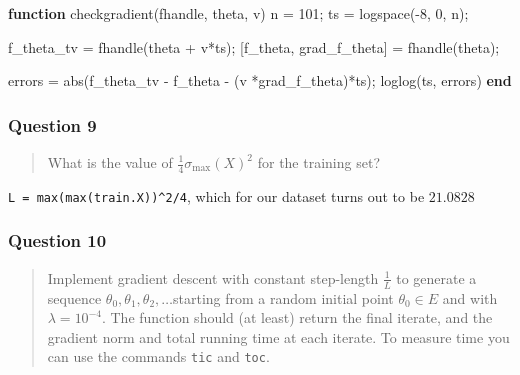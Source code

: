 \documentclass[
]{article}
\newenvironment{Shaded}{}{}
\newcommand{\FloatTok}[1]{\textcolor[rgb]{0.25,0.63,0.44}{#1}}
\newcommand{\KeywordTok}[1]{\textcolor[rgb]{0.00,0.44,0.13}{\textbf{#1}}}
\newcommand{\NormalTok}[1]{#1}
\newcommand{\OperatorTok}[1]{\textcolor[rgb]{0.40,0.40,0.40}{#1}}
\newcommand{\VariableTok}[1]{\textcolor[rgb]{0.10,0.09,0.49}{#1}}
\begin{document}
\begin{Shaded}
\begin{Highlighting}[]
\KeywordTok{function} \VariableTok{checkgradient}\NormalTok{(}\VariableTok{fhandle}\OperatorTok{,} \VariableTok{theta}\OperatorTok{,} \VariableTok{v}\NormalTok{)    }
    \VariableTok{n} \OperatorTok{=} \FloatTok{101}\OperatorTok{;}
    \VariableTok{ts} \OperatorTok{=} \VariableTok{logspace}\NormalTok{(}\OperatorTok{{-}}\FloatTok{8}\OperatorTok{,} \FloatTok{0}\OperatorTok{,} \VariableTok{n}\NormalTok{)}\OperatorTok{;}
    
    \VariableTok{f\_theta\_tv} \OperatorTok{=} \VariableTok{fhandle}\NormalTok{(}\VariableTok{theta} \OperatorTok{+} \VariableTok{v}\OperatorTok{*}\VariableTok{ts}\NormalTok{)}\OperatorTok{;}
\NormalTok{    [}\VariableTok{f\_theta}\OperatorTok{,} \VariableTok{grad\_f\_theta}\NormalTok{] }\OperatorTok{=} \VariableTok{fhandle}\NormalTok{(}\VariableTok{theta}\NormalTok{)}\OperatorTok{;}

    \VariableTok{errors} \OperatorTok{=} \VariableTok{abs}\NormalTok{(}\VariableTok{f\_theta\_tv} \OperatorTok{{-}} \VariableTok{f\_theta} \OperatorTok{{-}}\NormalTok{ (}\VariableTok{v}\OperatorTok{\textquotesingle{}} \OperatorTok{*}\VariableTok{grad\_f\_theta}\NormalTok{)}\OperatorTok{*}\VariableTok{ts}\NormalTok{)}\OperatorTok{;}
    \VariableTok{loglog}\NormalTok{(}\VariableTok{ts}\OperatorTok{,} \VariableTok{errors}\NormalTok{)}
\KeywordTok{end}
\end{Highlighting}
\end{Shaded}

\hypertarget{question-9}{%
\subsubsection{Question 9}\label{question-9}}

\begin{quote}
What is the value of \(\frac{1}{4}\sigma_{\max}(X)^2\) for the training
set?
\end{quote}

\texttt{L\ =\ max(max(train.X))\^{}2/4}, which for our dataset turns out
to be \(21.0828\)

\hypertarget{question-10}{%
\subsubsection{Question 10}\label{question-10}}

\begin{quote}
Implement gradient descent with constant step-length \(\frac{1}{L}\) to
generate a sequence \(\theta_0 , \theta_1 , \theta_2 , \dots\)starting
from a random initial point \(\theta_0 \in E\) and with
\(\lambda = 10^{−4}\). The function should (at least) return the final
iterate, and the gradient norm and total running time at each iterate.
To measure time you can use the commands \texttt{tic} and \texttt{toc}.
\end{quote}
\end{document}
